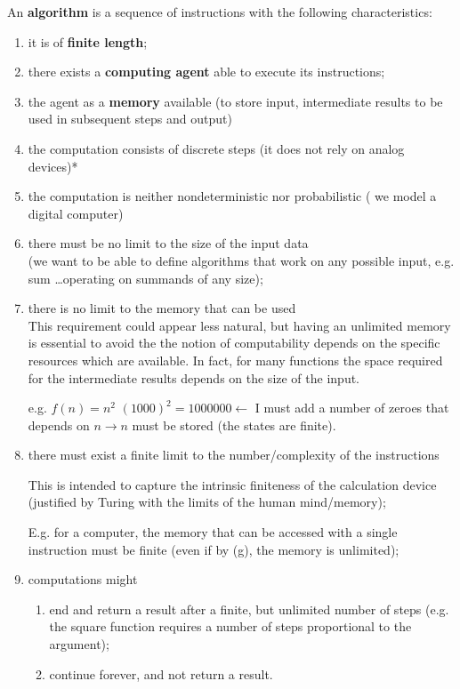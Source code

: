 An \textbf{algorithm} is a sequence of instructions with the following characteristics:
\begin{enumerate}[label=\alph*)]
\item
  \label{as:prog_fin}
  it is of \textbf{finite length};
\item there exists a \textbf{computing agent} able to execute its instructions;
\item the agent as a \textbf{memory} available (to store input, intermediate results to be used in subsequent steps and output)
\item the computation consists of discrete steps (it does not rely on analog devices)*
\item the computation is neither nondeterministic nor probabilistic (
  we model a  digital computer)
  
\item there must be no limit to the size of the input data\\
  (we want to be able to define algorithms that work on any possible
  input, e.g. sum \dots operating on summands of any size);
  
\item there is no limit to the memory that can be used\\
  This requirement could appear less natural, but having an unlimited
  memory is essential to avoid the the notion of computability depends
  on the specific resources which are available. In fact, for many
  functions the space required for the intermediate results depends on
  the size of the input.
  
  e.g. $f(n) = n^2$ $(1000)^2 = 1000000 \leftarrow$ I must add a
  number of zeroes that depends on $n \rightarrow n$ must be stored
  (the states are finite).

\item
  \label{as:istr_fin}
  there must exist a finite limit to the number/complexity of the
  instructions
  
  This is intended to capture the intrinsic finiteness of the
  calculation device (justified by Turing with the limits of the human
  mind/memory);
  
  E.g. for a computer, the memory that can be accessed with a single
  instruction must be finite (even if by
  (g), the memory is unlimited);
  
\item computations might
  \begin{enumerate}
    
  \item  end and return a result after a finite, but unlimited number of steps  
    (e.g. the square function requires a number of steps proportional to the argument);
    
  \item continue forever, and not return a result.
  \end{enumerate}
\end{enumerate}

